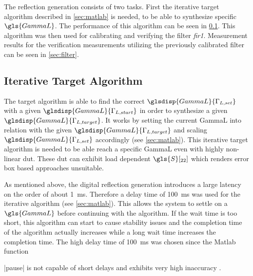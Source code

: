 \documentclass[12pt,a4paper,parskip=full,abstract=true,BCOR=12mm,twoside,open=right]{scrreprt}
\newcommand*{\SavedLstInline}{}
\DeclareRobustCommand*{\lstinline}{%
  \ifmmode
    \let\SavedBGroup\bgroup
    \def\bgroup{%
      \let\bgroup\SavedBGroup
      \hbox\bgroup
    }%
  \fi
  \SavedLstInline
}
\def\device#1{\textit{#1}}
\begin{document}
The reflection generation consists of two tasks. First the iterative target algorithm
described in \cref{sec:matlab} is needed, to be able to synthesize specific $\gls{GammaL}$.
The performance of this algorithm can be seen in \cref{sec:iterative}. This
algorithm was then used for calibrating and verifying the filter \device{fir1}. Measurement
results for the verification measurements utilizing the previously calibrated filter can be seen in \cref{sec:filter}.

\subsection{Iterative Target Algorithm}
\label{sec:iterative}

The target algorithm is able to find the correct $\glsdisp{GammaL}{\Gamma_{L,set}}$
with a given $\glsdisp{GammaL}{\Gamma_{L,start}}$ in order to synthesize a given
$\glsdisp{GammaL}{\Gamma_{L,target}}$. It works by setting the current \gls{GammaL}
into relation with the given $\glsdisp{GammaL}{\Gamma_{L,target}}$ and scaling
$\glsdisp{GammaL}{\Gamma_{L,set}}$ accordingly (see \cref{sec:matlab}). This
iterative target algorithm is needed to be able reach a specific \gls{GammaL} even
with highly non-linear \gls{dut}. These \gls{dut} can exhibit load dependent
$\gls{S}[_{22}]$ which renders error box based approaches unsuitable.

As mentioned above, the digital reflection generation introduces a large latency
on the order of about \SI{1}{\milli\second}. Therefore a delay time of \SI{100}{\milli\second}
was used for the iterative algorithm (see \cref{sec:matlab}). This allows the system to settle
on a $\gls{GammaL}$ before continuing with the algorithm. If the wait time is too short,
this algorithm can start to cause stability issues and the completion time of the algorithm
actually increases while a long wait time increases the completion time. The high delay
time of \SI{100}{\milli\second} was chosen since the Matlab function \lstinline|pause| is
not capable of short delays and exhibits very high inaccuracy \cite{matlab_pause}.
\end{document}
